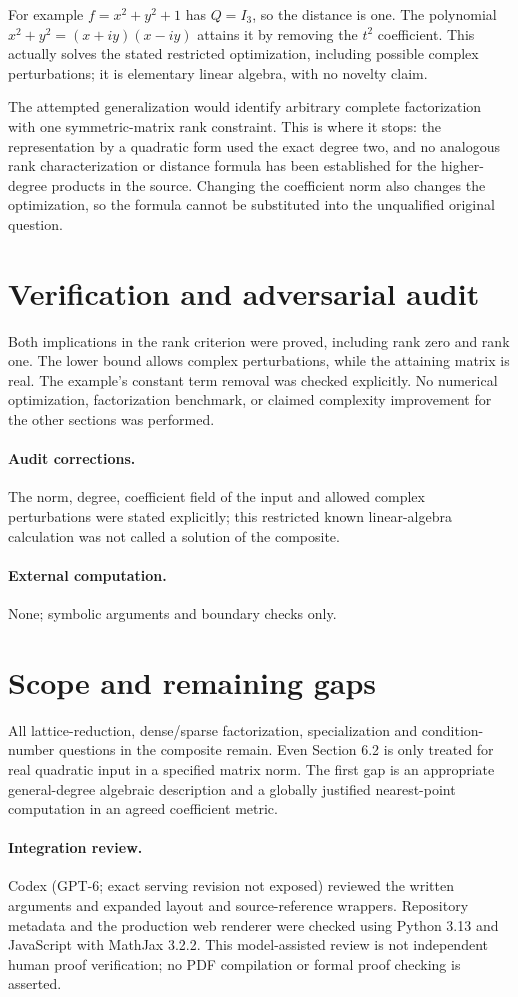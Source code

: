 \documentclass[11pt]{article}
\begin{document}
For example $f=x^2+y^2+1$ has $Q=I_3$, so the distance is one. The polynomial
$x^2+y^2=(x+iy)(x-iy)$ attains it by removing the $t^2$ coefficient. This
actually solves the stated restricted optimization, including possible complex
perturbations; it is elementary linear algebra, with no novelty claim.

The attempted generalization would identify arbitrary complete factorization
with one symmetric-matrix rank constraint. This is where it stops: the
representation by a quadratic form used the exact degree two, and no analogous
rank characterization or distance formula has been established for the
higher-degree products in the source. Changing the coefficient norm also changes
the optimization, so the formula cannot be substituted into the unqualified
original question.
\section{Verification and adversarial audit}
Both implications in the rank criterion were proved, including rank zero
and rank one. The lower bound allows complex perturbations, while the attaining
matrix is real. The example's constant term removal was checked explicitly.
No numerical optimization, factorization benchmark, or claimed complexity
improvement for the other sections was performed.
\paragraph{Audit corrections.} The norm, degree, coefficient field of the input and allowed complex perturbations were stated explicitly; this restricted known linear-algebra calculation was not called a solution of the composite.
\paragraph{External computation.} None; symbolic arguments and boundary checks only.
\section{Scope and remaining gaps}
All lattice-reduction, dense/sparse factorization, specialization and
condition-number questions in the composite remain. Even Section 6.2 is only
treated for real quadratic input in a specified matrix norm. The first gap is
an appropriate general-degree algebraic description and a globally justified
nearest-point computation in an agreed coefficient metric.
\paragraph{Integration review.} Codex (GPT-6; exact serving revision not exposed) reviewed the written arguments and expanded layout and source-reference wrappers. Repository metadata and the production web renderer were checked using Python 3.13 and JavaScript with MathJax 3.2.2. This model-assisted review is not independent human proof verification; no PDF compilation or formal proof checking is asserted.
\end{document}
